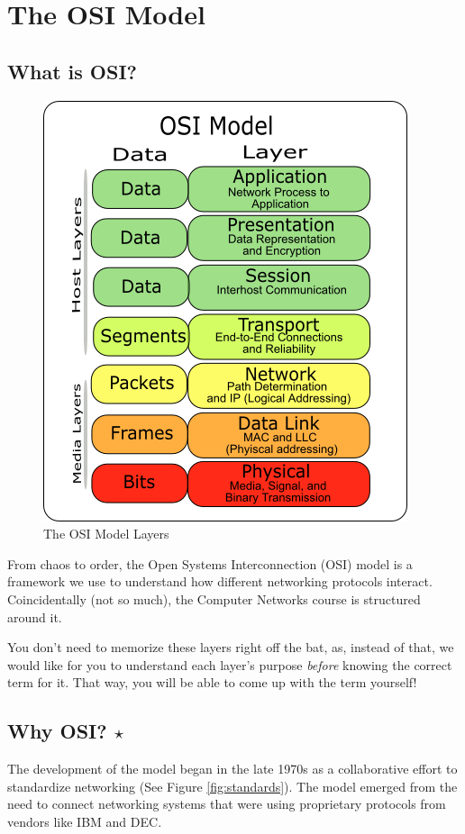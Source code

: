 \chapter{The OSI Model}\label{sec:osi_intro}
\section{What is OSI?}
\begin{figure}[h]
    \centering
    \includegraphics[width=.6\textwidth]{assets/osi/layers.png}
    \caption{The OSI Model Layers}\label{fig:osi_layers_intro}
\end{figure}
From chaos to order, the Open Systems Interconnection (OSI) model is a framework we use to understand how different networking protocols interact. Coincidentally (not so much), the Computer Networks course is structured around it.

You don't need to memorize these layers right off the bat, as, instead of that, we would like for you to understand each layer's purpose \textit{before} knowing the correct term for it. That way, you will be able to come up with the term yourself!

\section{Why OSI? $\star$}
The development of the model began in the late 1970s as a collaborative effort to standardize networking (See Figure \ref{fig:standards}). The model emerged from the need to connect networking systems that were using proprietary protocols from vendors like IBM and DEC.

